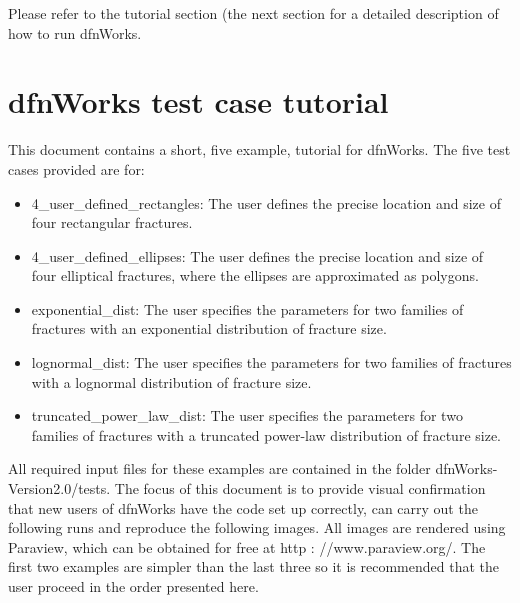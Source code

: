 \documentclass[letterpaper,10pt,english]{sphinxmanual}
\begin{document}
Please refer to the tutorial section (the next section for a detailed description of how to run dfnWorks.


\chapter{dfnWorks test case tutorial}
\label{examples:dfnworks-test-case-tutorial}\label{examples::doc}
This document contains a short, five example, tutorial for dfnWorks. The five test cases provided are for:
\begin{itemize}
\item {} 
4\_user\_defined\_rectangles: The user defines the precise location and size of four rectangular fractures.

\item {} 
4\_user\_defined\_ellipses: The user defines the precise location and size of four elliptical fractures, where the ellipses are approximated as polygons.

\item {} 
exponential\_dist: The user specifies the parameters for two families of fractures with an exponential distribution of fracture size.

\item {} 
lognormal\_dist: The user specifies the parameters for two families of fractures with a lognormal distribution of fracture size.

\item {} 
truncated\_power\_law\_dist: The user specifies the parameters for two families of fractures with a truncated power-law distribution of fracture size.

\end{itemize}

All required input files for these examples are contained in the folder dfnWorks-Version2.0/tests. The focus of this document is to provide visual confirmation that new users of dfnWorks have the code set up correctly, can carry out the following runs and reproduce the following images. All images are rendered using Paraview, which can be obtained for free at http : //www.paraview.org/. The first two examples are simpler than the last three so it is recommended that the user proceed in the order presented here.
\end{document}
